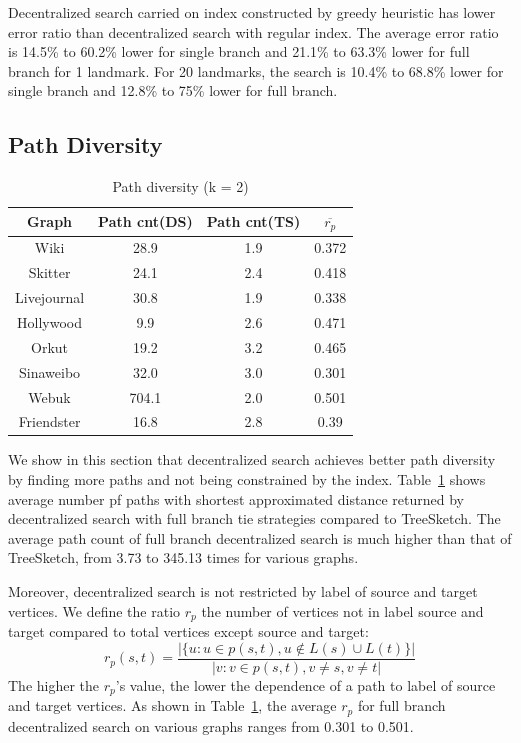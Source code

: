 Decentralized search carried on index constructed by greedy heuristic has lower error ratio than decentralized search with regular index. The average error ratio is 14.5\% to 60.2\% lower for single branch and 21.1\% to 63.3\% lower for full branch for 1 landmark. For 20 landmarks, the search is 10.4\% to 68.8\% lower for single branch and 12.8\% to 75\% lower for full branch.

\subsection{Path Diversity}
\label{eval_diversity}

\begin{table}
	\caption{Path diversity (k = 2)}
    \label{table:pdiv}
    \centering
    \begin{tabular}{c|ccc} \hline
				Graph&Path cnt(DS)&Path cnt(TS)& $\overline{r_p}$ \\ \hline
				Wiki&28.9&1.9&0.372 \\ 
				Skitter&24.1&2.4&0.418 \\ 
				Livejournal&30.8&1.9&0.338 \\ 
				Hollywood&9.9&2.6&0.471 \\ 
				Orkut&19.2&3.2&0.465 \\ 
				Sinaweibo&32.0&3.0&0.301 \\ 
				Webuk&704.1&2.0&0.501 \\ 
				Friendster&16.8&2.8&0.39 \\ \hline
    \end{tabular}
\end{table}

We show in this section that decentralized search achieves better path diversity by finding more paths and not being constrained by the index. Table~\ref{table:pdiv} shows average number pf paths with shortest approximated distance returned by decentralized search with full branch tie strategies compared to TreeSketch. The average path count of full branch decentralized search is much higher than that of TreeSketch, from 3.73 to 345.13 times for various graphs.

Moreover, decentralized search is not restricted by label of source and target vertices. We define the ratio $r_p$ the number of vertices not in label source and target compared to total vertices except source and target:
\[
r_p(s,t) = \frac{|\{u:u \in p(s,t), u \notin L(s) \cup L(t)\}|}{|{v:v \in p(s,t), v \neq s, v \neq t}|}
\]
The higher the $r_p$'s value, the lower the dependence of a path to label of source and target vertices. As shown in Table~\ref{table:pdiv}, the average $r_p$ for full branch decentralized search on various graphs ranges from 0.301 to 0.501.

